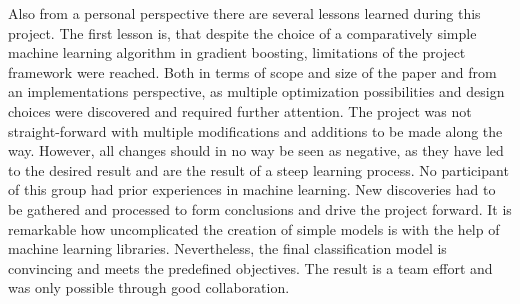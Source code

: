 
    Also from a personal perspective there are several lessons learned during this project. The first lesson is, that despite the choice of a comparatively simple 
    machine learning algorithm in gradient boosting, limitations of the project framework were reached. Both in terms of scope and size of the paper and from 
    an implementations perspective, as multiple optimization possibilities and design choices were discovered and required further attention. The project
    was not straight-forward with multiple modifications and additions to be made along the way. However, all changes should in no way be seen as negative, 
    as they have led to the desired result and are the result of a steep learning process.
    No participant of this group had prior experiences in machine learning. New discoveries had to be gathered and processed to 
    form conclusions and drive the project forward. It is remarkable how uncomplicated the creation of simple models is with the help of machine learning libraries. 
    Nevertheless, the final classification model is convincing and meets the predefined objectives. The result is a team effort and was only possible through 
    good collaboration. 

